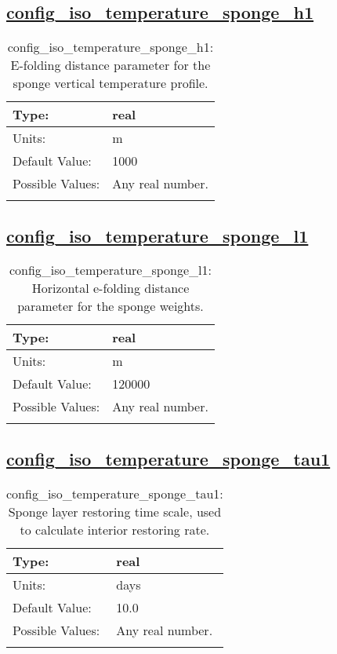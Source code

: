 \subsection[config\_iso\_temperature\_sponge\_h1]{\hyperref[sec:nm_tab_iso]{config\_iso\_temperature\_sponge\_h1}}
\label{subsec:nm_sec_config_iso_temperature_sponge_h1}
\begin{center}
\begin{longtable}{| p{2.0in} || p{4.0in} |}
    \hline
    Type: & real \\
    \hline
    Units: & \si{m} \\
    \hline
    Default Value: & 1000 \\
    \hline
    Possible Values: & Any real number. \\
    \hline
    \caption{config\_iso\_temperature\_sponge\_h1: E-folding distance parameter for the sponge vertical temperature profile.}
\end{longtable}
\end{center}
\subsection[config\_iso\_temperature\_sponge\_l1]{\hyperref[sec:nm_tab_iso]{config\_iso\_temperature\_sponge\_l1}}
\label{subsec:nm_sec_config_iso_temperature_sponge_l1}
\begin{center}
\begin{longtable}{| p{2.0in} || p{4.0in} |}
    \hline
    Type: & real \\
    \hline
    Units: & \si{m} \\
    \hline
    Default Value: & 120000 \\
    \hline
    Possible Values: & Any real number. \\
    \hline
    \caption{config\_iso\_temperature\_sponge\_l1: Horizontal e-folding distance parameter for the sponge weights.}
\end{longtable}
\end{center}
\subsection[config\_iso\_temperature\_sponge\_tau1]{\hyperref[sec:nm_tab_iso]{config\_iso\_temperature\_sponge\_tau1}}
\label{subsec:nm_sec_config_iso_temperature_sponge_tau1}
\begin{center}
\begin{longtable}{| p{2.0in} || p{4.0in} |}
    \hline
    Type: & real \\
    \hline
    Units: & \si{days} \\
    \hline
    Default Value: & 10.0 \\
    \hline
    Possible Values: & Any real number. \\
    \hline
    \caption{config\_iso\_temperature\_sponge\_tau1: Sponge layer restoring time scale, used to calculate interior restoring rate.}
\end{longtable}
\end{center}

